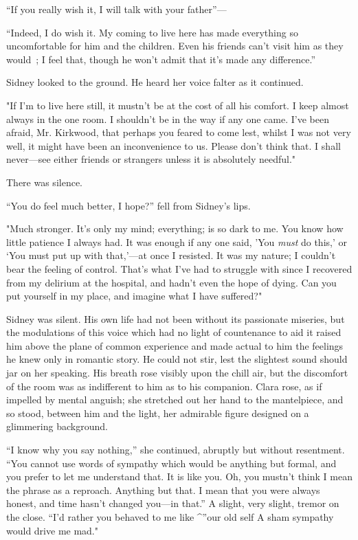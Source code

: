 ``If you really wish it, I will talk with your father''---

``Indeed, I do wish it. My coming to live here has made everything so
uncomfortable for him and the children. Even his friends can't visit him
as they would~; I feel that, though he won't admit that it's made any
difference.''

Sidney looked to the ground. He heard her voice falter as it continued.

"If I'm to live here still, it mustn't be at the cost of all his
comfort. I keep almost {\protect\hypertarget{83}{}{}} always in the one
room. I shouldn't be in the way if any one came. I've been afraid, Mr.
Kirkwood, that perhaps you feared to come lest, whilst I was not very
well, it might have been an inconvenience to us. Please don't think
that. I shall never---see either friends or strangers unless it is
absolutely needful."

There was silence.

``You do feel much better, I hope?'' fell from Sidney's lips.

"Much stronger. It's only my mind; everything; is so dark to me. You
know how little patience I always had. It was enough if any one said,
'You \emph{must} do this,' or `You must put up with that,'---at once I
resisted. It was my nature; I couldn't bear the feeling of control.
That's what I've had to struggle with since I recovered from my delirium
at the hospital, and hadn't even the hope of dying. Can you put yourself
in my place, and imagine what I have suffered?"

Sidney was silent. His own life had not been without its passionate
miseries, but the modulations of this voice which had no light of
countenance to aid it raised him above the
{\protect\hypertarget{84}{}{}} plane of common experience and made
actual to him the feelings he knew only in romantic story. He could not
stir, lest the slightest sound should jar on her speaking. His breath
rose visibly upon the chill air, but the discomfort of the room was as
indifferent to him as to his companion. Clara rose, as if impelled by
mental anguish; she stretched out her hand to the mantelpiece, and so
stood, between him and the light, her admirable figure designed on a
glimmering background.

``I know why you say nothing,'' she continued, abruptly but without
resentment. ``You cannot use words of sympathy which would be anything
but formal, and you prefer to let me understand that. It is like you.
Oh, you mustn't think I mean the phrase as a reproach. Anything but
that. I mean that you were always honest, and time hasn't changed
you---in that.'' A slight, very slight, tremor on the close. ``I'd
rather you behaved to me like \^{}''our old self A sham sympathy would
drive me mad."

